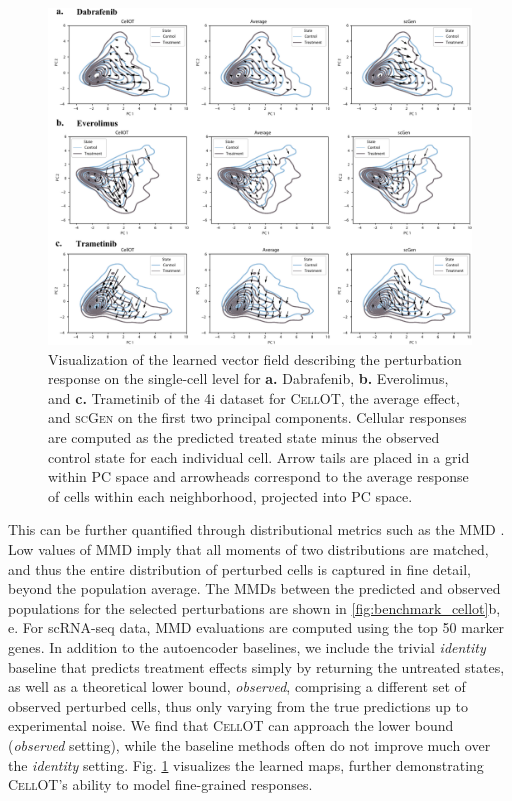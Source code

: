  \begin{figure}[t]
     \centering
     \includegraphics[width=\textwidth]{figures/fig_4i_vector_fields.pdf}
     \caption{Visualization of the learned vector field describing the perturbation response on the single-cell level for \textbf{a.} Dabrafenib, \textbf{b.} Everolimus, and \textbf{c.} Trametinib of the 4i dataset for \textsc{CellOT}, the average effect, and \textsc{scGen} on the first two principal components. Cellular responses are computed as the predicted treated state minus the observed control state for each individual cell. Arrow tails are placed in a grid within PC space and arrowheads correspond to the average response of cells within each neighborhood, projected into PC space.}
     \label{fig:4i_vector_fields}
 \end{figure}

 This can be further quantified %
through distributional metrics such as the \acrfull{MMD} \citep{gretton2012kernel}.
Low values of \acrshort{MMD} imply that all moments of two distributions are matched, and thus the entire distribution of perturbed cells is captured in fine detail, beyond the population average.
The \acrshort{MMD}s between the predicted and observed populations for the selected perturbations are shown in \cref{fig:benchmark_cellot}b, e.
For scRNA-seq data, \acrshort{MMD} evaluations are computed using the top 50 marker genes.
In addition to the autoencoder baselines, we include the trivial \emph{identity} baseline that predicts treatment effects simply by returning the untreated states,
as well as a theoretical lower bound, \emph{observed}, comprising a different set of observed perturbed cells, thus only varying from the true predictions up to experimental noise.
We find that \textsc{CellOT} can approach the lower bound (\emph{observed} setting), while the baseline methods often do not improve much over the \emph{identity} setting.
Fig. \ref{fig:4i_vector_fields} visualizes the learned maps, %
further demonstrating \textsc{CellOT}'s ability to model fine-grained responses.


